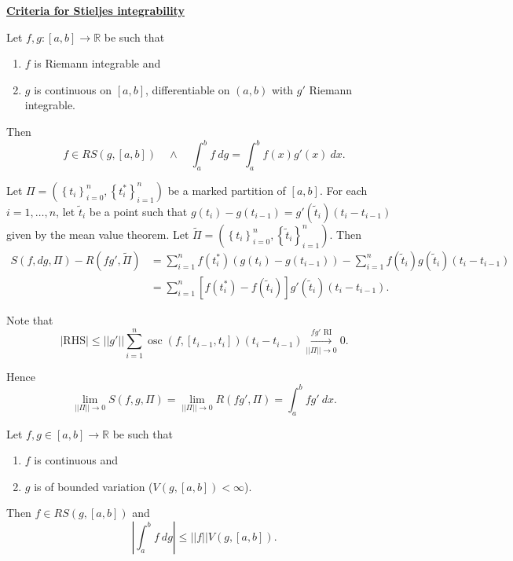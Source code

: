 \documentclass{notes}
\begin{document}
\newpage

{\boldmath \bfseries \underline{Criteria for Stieljes integrability}}

\begin{thm}
  Let $f, g \colon [a, b] \to \mathbb R$ be such that 
  \begin{enumerate}
    \item $f$ is Riemann integrable and 

    \item $g$ is continuous on $[a, b]$, differentiable on $(a, b)$ with $g'$ Riemann integrable.
  \end{enumerate}
  Then 
  \[
    f \in RS(g, [a, b]) \quad \land \quad \int_a^b f\ dg = \int_a^b f(x) g'(x)\ dx.
  \]
\end{thm}

\begin{prf}
  Let $\Pi = (\left \{ t_i \right \}_{i = 0}^n, \left \{ t^*_i \right \}_{i = 1}^n)$ be a marked partition of $[a, b]$.
  For each $i = 1, \dots, n$, let $\tilde t_i$ be a point such that $g(t_i) - g(t_{i - 1}) = g'(\tilde t_i) (t_i - t_{i - 1})$ given by the mean value theorem.
  Let $\tilde \Pi = (\left \{ t_i \right \}_{i = 0}^n, \left \{ \tilde t_i \right \}_{i = 1}^n)$.
  Then 
  \begin{align*}
    S(f, dg, \Pi) - R(f g', \tilde \Pi) &= \sum_{i = 1}^n f(t^*_i) (g(t_i) - g(t_{i - 1})) - \sum_{i = 1}^n f(\tilde t_i) g(\tilde t_i) (t_i - t_{i - 1}) \\ 
    &= \sum_{i = 1}^n [f(t^*_i) - f(\tilde t_i)] g'(\tilde t_i) (t_i - t_{i - 1}).
  \end{align*}
  
  Note that 
  \[
    \left | \text{RHS} \right | \leq ||g'|| \sum_{i = 1}^n \operatorname{osc}(f, [t_{i - 1}, t_i]) (t_i - t_{i - 1}) \overset{\text{$f g'$ RI}}{\underset{||\Pi|| \to 0}{\longrightarrow}} 0. 
  \]
  
  Hence 
  \[
    \lim_{||\Pi|| \to 0} S(f, g, \Pi) = \lim_{||\Pi|| \to 0} R(f g', \Pi) = \int_a^b f g'\ dx.
  \]
\end{prf}

\begin{thm}[BV condition]
  Let $f, g \in [a, b] \to \mathbb R$ be such that 
  \begin{enumerate}
    \item $f$ is continuous and 
    
    \item $g$ is of bounded variation ($V(g, [a, b]) < \infty$).
  \end{enumerate}
  
  Then $f \in RS(g, [a, b])$ and 
  \[
    \left | \int_a^b f\ dg \right | \leq ||f|| V(g, [a, b]).
  \]
\end{thm}
\end{document}
